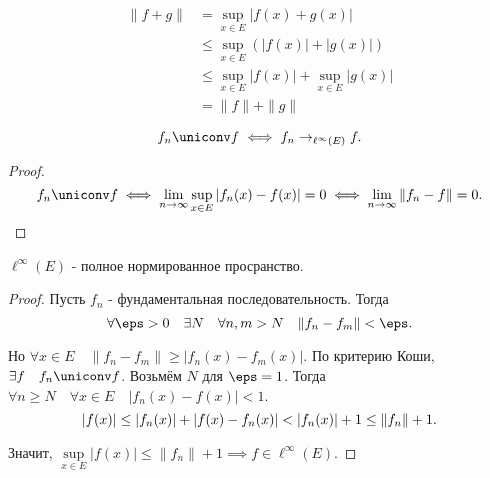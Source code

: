 \begin{remark} \thmslashn

    \begin{equation*}
        \begin{split}
            \|f + g\| 
            &= \sup\limits_{x\in E} |f(x) + g(x)|\\
            &\le \sup\limits_{x\in E}(|f(x)| + |g(x)|)\\
            &\le \sup\limits_{x\in E} |f(x)| + \sup\limits_{x\in E}|g(x)|\\
            &= \|f\| + \|g\| 
        \end{split}
    \end{equation*}
\end{remark}
\begin{theorem} \thmslashn

    \[ f_{n} \uniconv f \iff f_{n} \to_{\ell^{\infty}(E)} f  .\]
    \begin{proof} \thmslashn
    
        \[ f_{n} \uniconv f \iff \lim\limits_{n \to \infty} \sup\limits_{x\in E} |f_{n}(x) - f(x)| = 0 \iff \lim\limits_{n \to \infty} \|f_{n} - f\| = 0  .\] 
    \end{proof}
\end{theorem}
\begin{theorem} \thmslashn

    $\ell^{\infty}(E)$ - полное нормированное просранство.
    \begin{proof} \thmslashn
    
        Пусть $f_{n}$ - фундаментальная последовательность. Тогда
        \[ \forall{\eps > 0}\quad \exists{N}\quad \forall{n,m > N}\quad \|f_{n} - f_{m}\| < \eps .\]

        Но $\forall{x\in E}\quad \|f_{n} - f_{m}\| \ge |f_{n}(x) - f_{m}(x)|$. По критерию Коши, $\exists{f}\quad f_{n} \uniconv f$. Возьмём $N$ для $\eps=1$. Тогда $\forall{n \ge N}\quad \forall{x\in E}\quad  |f_{n}(x) - f(x)| < 1$.
        \[ |f(x)| \le |f_{n}(x)| + |f(x) - f_{n}(x)| < |f_{n}(x)| + 1 \le \|f_{n}\| + 1 .\qedhere\] 

        Значит, $\sup\limits_{x\in E} |f(x)| \le \|f_{n}\| + 1 \implies f\in \ell^{\infty}(E)$.
    \end{proof}
\end{theorem}
